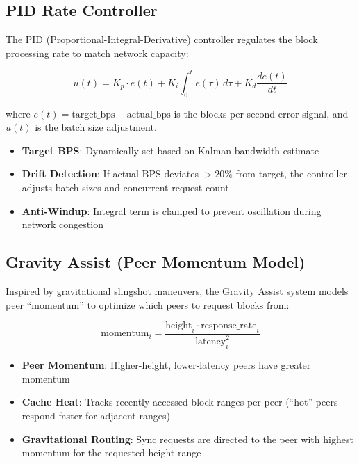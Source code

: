 \documentclass[11pt,a4paper]{article}
\begin{document}
\subsection{PID Rate Controller}

The PID (Proportional-Integral-Derivative) controller regulates the block processing rate to match network capacity:

\begin{equation}
u(t) = K_p \cdot e(t) + K_i \int_0^t e(\tau)\,d\tau + K_d \frac{de(t)}{dt}
\end{equation}

where $e(t) = \text{target\_bps} - \text{actual\_bps}$ is the blocks-per-second error signal, and $u(t)$ is the batch size adjustment.

\begin{itemize}
    \item \textbf{Target BPS}: Dynamically set based on Kalman bandwidth estimate
    \item \textbf{Drift Detection}: If actual BPS deviates $> 20\%$ from target, the controller adjusts batch sizes and concurrent request count
    \item \textbf{Anti-Windup}: Integral term is clamped to prevent oscillation during network congestion
\end{itemize}

\subsection{Gravity Assist (Peer Momentum Model)}

Inspired by gravitational slingshot maneuvers, the Gravity Assist system models peer ``momentum'' to optimize which peers to request blocks from:

\begin{equation}
\text{momentum}_i = \frac{\text{height}_i \cdot \text{response\_rate}_i}{\text{latency}_i^2}
\end{equation}

\begin{itemize}
    \item \textbf{Peer Momentum}: Higher-height, lower-latency peers have greater momentum
    \item \textbf{Cache Heat}: Tracks recently-accessed block ranges per peer (``hot'' peers respond faster for adjacent ranges)
    \item \textbf{Gravitational Routing}: Sync requests are directed to the peer with highest momentum for the requested height range
\end{itemize}
\end{document}
